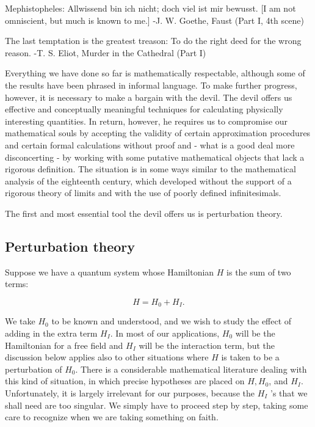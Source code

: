 \documentclass[10pt, letterpaper]{article}
\begin{document}
\begin{displayquote}
Mephistopheles: Allwissend bin ich nicht; doch viel ist mir bewusst. [I am not omniscient, but much is known to me.] -J. W. Goethe, Faust (Part I, 4th scene)
\end{displayquote}

\begin{displayquote}
The last temptation is the greatest treason: To do the right deed for the wrong reason. -T. S. Eliot, Murder in the Cathedral (Part I)
\end{displayquote}

Everything we have done so far is mathematically respectable, although some of the results have been phrased in informal language. To make further progress, however, it is necessary to make a bargain with the devil. The devil offers us effective and conceptually meaningful techniques for calculating physically interesting quantities. In return, however, he requires us to compromise our mathematical souls by accepting the validity of certain approximation procedures and certain formal calculations without proof and - what is a good deal more disconcerting - by working with some putative mathematical objects that lack a rigorous definition. The situation is in some ways similar to the mathematical analysis of the eighteenth century, which developed without the support of a rigorous theory of limits and with the use of poorly defined infinitesimals.

The first and most essential tool the devil offers us is perturbation theory.

\subsection*{Perturbation theory}
Suppose we have a quantum system whose Hamiltonian $H$ is the sum of two terms:

$$
H=H_{0}+H_{I} .
$$

We take $H_{0}$ to be known and understood, and we wish to study the effect of adding in the extra term $H_{I}$. In most of our applications, $H_{0}$ will be the Hamiltonian for a free field and $H_{I}$ will be the interaction term, but the discussion below applies also to other situations where $H$ is taken to be a perturbation of $H_{0}$. There is a considerable mathematical literature dealing with this kind of situation, in which precise hypotheses are placed on $H, H_{0}$, and $H_{I}$. Unfortunately, it is largely irrelevant for our purposes, because the $H_{I}$ 's that we shall need are too singular. We simply have to proceed step by step, taking some care to recognize when we are taking something on faith.
\end{document}

